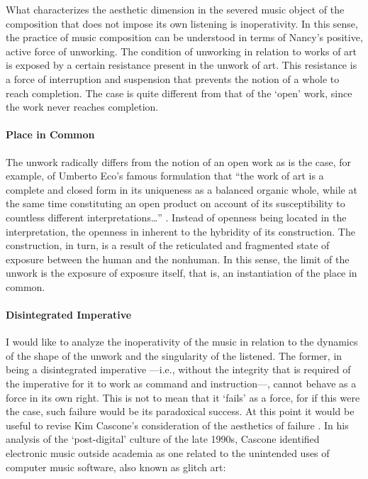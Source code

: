 What characterizes the aesthetic dimension in the severed music object of the composition that does not impose its own listening is inoperativity. In this sense, the practice of music composition can be understood in terms of Nancy's positive, active force of unworking. The condition of unworking in relation to works of art is exposed by a certain resistance present in the unwork of art. This resistance is a force of interruption and suspension that prevents the notion of a whole to reach completion. The case is quite different from that of the `open' work, since the work never reaches completion.

\paragraph{Place in Common}
The unwork radically differs from the notion of an open work as is the case, for example, of Umberto Eco's famous formulation that ``the work of art is a complete and closed form in its uniqueness as a balanced organic whole, while at the same time constituting an open product on account of its susceptibility to countless different interpretations\dots'' \parencite{Eco04:The}. Instead of openness being located in the interpretation, the openness in inherent to the hybridity of its construction. The construction, in turn, is a result of the reticulated and fragmented state of exposure between the human and the nonhuman. In this sense, the limit of the unwork is the exposure of exposure itself, that is, an instantiation of the place in common.

\paragraph{Disintegrated Imperative}
I would like to analyze the inoperativity of the music in relation to the dynamics of the shape of the unwork and the singularity of the listened. The former, in being a disintegrated imperative ---i.e., without the integrity that is required of the imperative for it to work as command and instruction---, cannot behave as a force in its own right. This is not to mean that it `fails' as a force, for if this were the case, such failure would be its paradoxical success. At this point it would be useful to revise Kim Cascone's consideration of the aesthetics of failure \parencite{Cas00:The}. In his analysis of the `post-digital' culture of the late 1990s, Cascone identified electronic music outside academia as one related to the unintended uses of computer music software, also known as glitch art:

